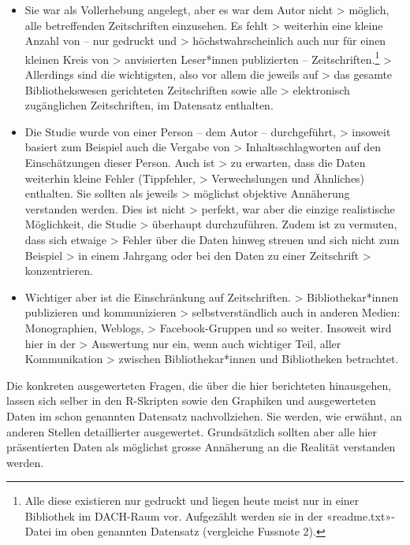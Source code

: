 \documentclass[a4paper,
fontsize=11pt,
oneside,
numbers=noperiodatend,
parskip=half-,
bibliography=totoc,
final
]{scrartcl}
\begin{document}
\begin{itemize}
\item
  Sie war als Vollerhebung angelegt, aber es war dem Autor nicht
  \textgreater{} möglich, alle betreffenden Zeitschriften einzusehen. Es
  fehlt \textgreater{} weiterhin eine kleine Anzahl von -- nur gedruckt
  und \textgreater{} höchstwahrscheinlich auch nur für einen kleinen
  Kreis von \textgreater{} anvisierten Leser*innen publizierten --
  Zeitschriften.\footnote{Alle diese existieren nur gedruckt und liegen
    heute meist nur in einer Bibliothek im DACH-Raum vor. Aufgezählt
    werden sie in der «readme.txt»-Datei im oben genannten Datensatz
    (vergleiche Fussnote 2).} \textgreater{} Allerdings sind die
  wichtigsten, also vor allem die jeweils auf \textgreater{} das gesamte
  Bibliothekswesen gerichteten Zeitschriften sowie alle \textgreater{}
  elektronisch zugänglichen Zeitschriften, im Datensatz enthalten.
\item
  Die Studie wurde von einer Person -- dem Autor -- durchgeführt,
  \textgreater{} insoweit basiert zum Beispiel auch die Vergabe von
  \textgreater{} Inhaltsschlagworten auf den Einschätzungen dieser
  Person. Auch ist \textgreater{} zu erwarten, dass die Daten weiterhin
  kleine Fehler (Tippfehler, \textgreater{} Verwechslungen und
  Ähnliches) enthalten. Sie sollten als jeweils \textgreater{} möglichst
  objektive Annäherung verstanden werden. Dies ist nicht \textgreater{}
  perfekt, war aber die einzige realistische Möglichkeit, die Studie
  \textgreater{} überhaupt durchzuführen. Zudem ist zu vermuten, dass
  sich etwaige \textgreater{} Fehler über die Daten hinweg streuen und
  sich nicht zum Beispiel \textgreater{} in einem Jahrgang oder bei den
  Daten zu einer Zeitschrift \textgreater{} konzentrieren.
\item
  Wichtiger aber ist die Einschränkung auf Zeitschriften. \textgreater{}
  Bibliothekar*innen publizieren und kommunizieren \textgreater{}
  selbstverständlich auch in anderen Medien: Monographien, Weblogs,
  \textgreater{} Facebook-Gruppen und so weiter. Insoweit wird hier in
  der \textgreater{} Auswertung nur ein, wenn auch wichtiger Teil, aller
  Kommunikation \textgreater{} zwischen Bibliothekar*innen und
  Bibliotheken betrachtet.
\end{itemize}

Die konkreten ausgewerteten Fragen, die über die hier berichteten
hinausgehen, lassen sich selber in den R-Skripten sowie den Graphiken
und ausgewerteten Daten im schon genannten Datensatz nachvollziehen. Sie
werden, wie erwähnt, an anderen Stellen detaillierter ausgewertet.
Grundsätzlich sollten aber alle hier präsentierten Daten als möglichst
grosse Annäherung an die Realität verstanden werden.
\end{document}
